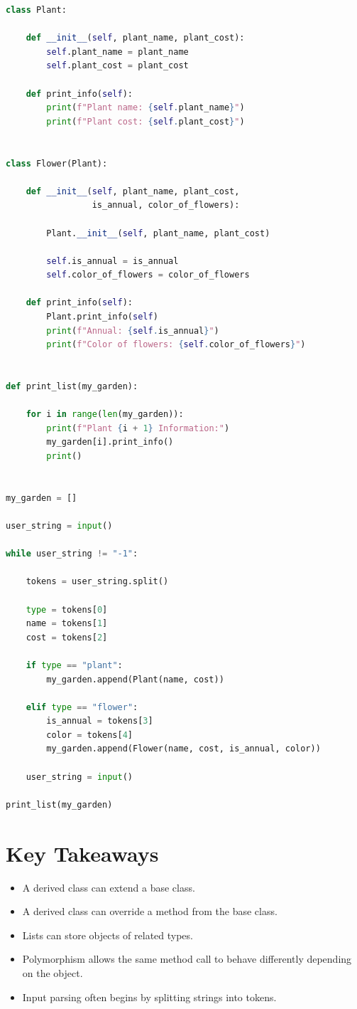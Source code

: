 \documentclass[11pt]{article}
\begin{document}
\begin{lstlisting}[language=Python]
class Plant:

    def __init__(self, plant_name, plant_cost):
        self.plant_name = plant_name
        self.plant_cost = plant_cost

    def print_info(self):
        print(f"Plant name: {self.plant_name}")
        print(f"Plant cost: {self.plant_cost}")


class Flower(Plant):

    def __init__(self, plant_name, plant_cost,
                 is_annual, color_of_flowers):

        Plant.__init__(self, plant_name, plant_cost)

        self.is_annual = is_annual
        self.color_of_flowers = color_of_flowers

    def print_info(self):
        Plant.print_info(self)
        print(f"Annual: {self.is_annual}")
        print(f"Color of flowers: {self.color_of_flowers}")


def print_list(my_garden):

    for i in range(len(my_garden)):
        print(f"Plant {i + 1} Information:")
        my_garden[i].print_info()
        print()


my_garden = []

user_string = input()

while user_string != "-1":

    tokens = user_string.split()

    type = tokens[0]
    name = tokens[1]
    cost = tokens[2]

    if type == "plant":
        my_garden.append(Plant(name, cost))

    elif type == "flower":
        is_annual = tokens[3]
        color = tokens[4]
        my_garden.append(Flower(name, cost, is_annual, color))

    user_string = input()

print_list(my_garden)
\end{lstlisting}

\section{Key Takeaways}

\begin{itemize}
    \item A derived class can extend a base class.
    \item A derived class can override a method from the base class.
    \item Lists can store objects of related types.
    \item Polymorphism allows the same method call to behave differently depending on the object.
    \item Input parsing often begins by splitting strings into tokens.
\end{itemize}
\end{document}
